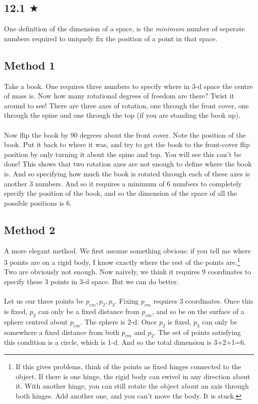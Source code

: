 
\subsection{12.1 $\bigstar$}
One definition of the dimension of a space, is the \emph{minimum} number of seperate numbers required to uniquely fix the position of a point in that space. 
\subsection*{Method 1}
Take a book. One requires three numbers to specify where in 3-d space the centre of mass is. Now how many rotational degrees of freedom are there? Twist it around to see! There are three axes of rotation, one through the front cover, one through the spine and one through the top (if you are standing the book up).\\ \\ Now flip the book by 90 degrees about the front cover. Note the position of the book. Put it back to where it was, and try to get the book to the front-cover flip position by only turning it about the spine and top. You will see this can't be done! This shows that two rotation axes are not enough to define where the book is. And so specifying how much the book is rotated through each of these axes is another 3 numbers. And so it requires a minimum of 6 numbers to completely specify the position of the book, and so the dimension of the space of all the possible positions is 6. 

\subsection*{Method 2} 
A more elegant method. We first assume something obvious: if you tell me where 3 points are on a rigid body, I know exactly where the rest of the points are.\footnote{If this gives problems, think of the points as fixed hinges connected to the object. If there is one hinge, the rigid body can swivel in any direction about it. With another hinge, you can still rotate the object about an axis through both hinges. Add another one, and you can't move the body. It is stuck. } Two are obviously not enough. Now naively, we think it requires 9 coordinates to specify these 3 points in 3-d space. But we can do better. \\ \\ Let us our three points be $p_{cm}, p_2, p_3$. Fixing $p_{cm}$ requires 3 coordinates. Once this is fixed, $p_2$ can only be a fixed distance from $p_{cm}$, and so be on the surface of a sphere centred about $p_{cm}$. The sphere is 2-d. Once $p_2$ is fixed, $p_3$ can only be somewhere a fixed distance from both $p_{cm}$ and $p_2$. The set of points satisfying this condition is a circle, which is 1-d. And so the total dimension is 3+2+1=6.
